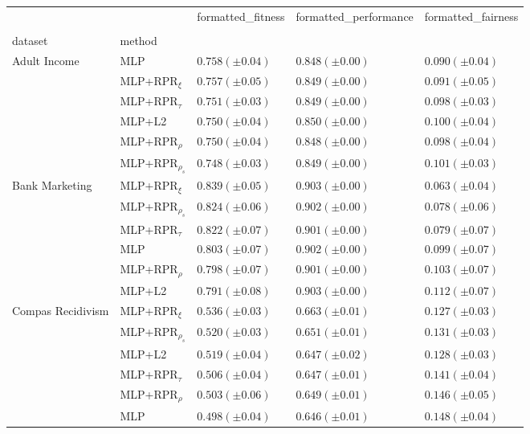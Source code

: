 \begin{tabular}{lllll}
\toprule
 &  & formatted_fitness & formatted_performance & formatted_fairness \\
 &  &  &  &  \\
dataset & method &  &  &  \\
\midrule
\multirow[t]{6}{*}{Adult Income} & MLP & $0.758 (\pm0.04)$ & $0.848 (\pm0.00)$ & $0.090 (\pm0.04)$ \\
 & MLP+RPR$_{\xi}$ & $0.757 (\pm0.05)$ & $0.849 (\pm0.00)$ & $0.091 (\pm0.05)$ \\
 & MLP+RPR$_{\tau}$ & $0.751 (\pm0.03)$ & $0.849 (\pm0.00)$ & $0.098 (\pm0.03)$ \\
 & MLP+L2 & $0.750 (\pm0.04)$ & $0.850 (\pm0.00)$ & $0.100 (\pm0.04)$ \\
 & MLP+RPR$_{\rho}$ & $0.750 (\pm0.04)$ & $0.848 (\pm0.00)$ & $0.098 (\pm0.04)$ \\
 & MLP+RPR$_{\rho_s}$ & $0.748 (\pm0.03)$ & $0.849 (\pm0.00)$ & $0.101 (\pm0.03)$ \\
\cline{1-5}
\multirow[t]{6}{*}{Bank Marketing} & MLP+RPR$_{\xi}$ & $0.839 (\pm0.05)$ & $0.903 (\pm0.00)$ & $0.063 (\pm0.04)$ \\
 & MLP+RPR$_{\rho_s}$ & $0.824 (\pm0.06)$ & $0.902 (\pm0.00)$ & $0.078 (\pm0.06)$ \\
 & MLP+RPR$_{\tau}$ & $0.822 (\pm0.07)$ & $0.901 (\pm0.00)$ & $0.079 (\pm0.07)$ \\
 & MLP & $0.803 (\pm0.07)$ & $0.902 (\pm0.00)$ & $0.099 (\pm0.07)$ \\
 & MLP+RPR$_{\rho}$ & $0.798 (\pm0.07)$ & $0.901 (\pm0.00)$ & $0.103 (\pm0.07)$ \\
 & MLP+L2 & $0.791 (\pm0.08)$ & $0.903 (\pm0.00)$ & $0.112 (\pm0.07)$ \\
\cline{1-5}
\multirow[t]{6}{*}{Compas Recidivism} & MLP+RPR$_{\xi}$ & $0.536 (\pm0.03)$ & $0.663 (\pm0.01)$ & $0.127 (\pm0.03)$ \\
 & MLP+RPR$_{\rho_s}$ & $0.520 (\pm0.03)$ & $0.651 (\pm0.01)$ & $0.131 (\pm0.03)$ \\
 & MLP+L2 & $0.519 (\pm0.04)$ & $0.647 (\pm0.02)$ & $0.128 (\pm0.03)$ \\
 & MLP+RPR$_{\tau}$ & $0.506 (\pm0.04)$ & $0.647 (\pm0.01)$ & $0.141 (\pm0.04)$ \\
 & MLP+RPR$_{\rho}$ & $0.503 (\pm0.06)$ & $0.649 (\pm0.01)$ & $0.146 (\pm0.05)$ \\
 & MLP & $0.498 (\pm0.04)$ & $0.646 (\pm0.01)$ & $0.148 (\pm0.04)$ \\
\cline{1-5}

\end{tabular}
